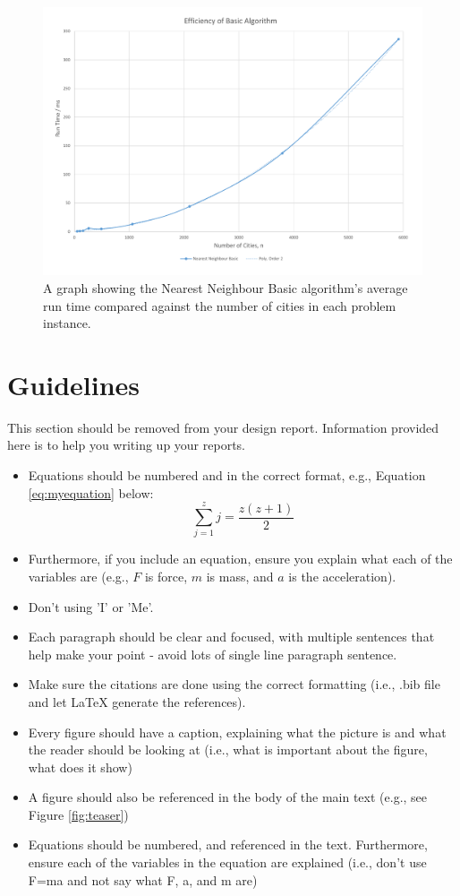 \documentclass[conference,backref=page]{acmsiggraph}
\begin{document}
\begin{figure}[t]
	\includegraphics[width=\textwidth]{images/efficiency_basic.pdf}
	\caption{A graph showing the Nearest Neighbour Basic algorithm's average run time compared against the number of cities in each problem instance.}
	\label{fig2}
\end{figure}

\section{Guidelines}
This section should be removed from your design report. Information provided here is to help you writing up your reports.

\begin{itemize}
\item Equations should be numbered and in the correct format, e.g., Equation \ref{eq:myequation} below:
\begin{equation} \label{eq:myequation}
 \sum_{j=1}^{z} j = \frac{z(z+1)}{2}
\end{equation}
\item Furthermore, if you include an equation, ensure you explain what each of the variables are (e.g., $F$ is force, $m$ is mass, and $a$ is the acceleration).
\item Don't using 'I' or 'Me'.
\item Each paragraph should be clear and focused, with multiple sentences that help make your point - avoid lots of single line paragraph sentence.
\item Make sure the citations are done using the correct formatting (i.e., .bib file and let LaTeX generate the references).
\item Every figure should have a caption, explaining what the picture is and what the reader should be looking at (i.e., what is important about the figure, what does it show)
\item A figure should also be referenced in the body of the main text (e.g., see Figure \ref{fig:teaser})
\item Equations should be numbered, and referenced in the text. Furthermore, ensure each of the variables in the equation are explained (i.e., don't use F=ma and not say what F, a, and m are)
\end{itemize}
\end{document}
